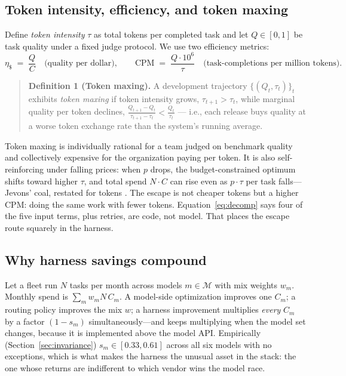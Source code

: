\documentclass[11pt]{article}
\newcommand{\NM}{six}                   %
\begin{document}
\subsection{Token intensity, efficiency, and token maxing}

Define \emph{token intensity} $\tau$ as total tokens per completed task and let $Q\in[0,1]$ be task quality under a fixed judge protocol. We use two efficiency metrics:
\begin{equation}
\eta_{\$} \;=\; \frac{Q}{C} \quad \text{(quality per dollar)}, \qquad
\mathrm{CPM} \;=\; \frac{Q \cdot 10^{6}}{\tau} \quad \text{(task-completions per million tokens)}.
\label{eq:eff}
\end{equation}

\begin{quote}
\textbf{Definition 1 (Token maxing).}\label{def:maxing}
A development trajectory $\{(Q_t,\tau_t)\}_t$ exhibits \emph{token maxing} if token intensity grows, $\tau_{t+1} > \tau_t$, while marginal quality per token declines, $\frac{Q_{t+1}-Q_t}{\tau_{t+1}-\tau_t} < \frac{Q_t}{\tau_t}$ --- i.e., each release buys quality at a worse token exchange rate than the system's running average.
\end{quote}

Token maxing is individually rational for a team judged on benchmark quality and collectively expensive for the organization paying per token. It is also self-reinforcing under falling prices: when $p$ drops, the budget-constrained optimum shifts toward higher $\tau$, and total spend $N\cdot C$ can rise even as $p\cdot\tau$ per task falls---Jevons' coal, restated for tokens \cite{jevons1865,epoch2025}. The escape is not cheaper tokens but a higher $\mathrm{CPM}$: doing the same work with fewer tokens. Equation~\eqref{eq:decomp} says four of the five input terms, plus retries, are code, not model. That places the escape route squarely in the harness.

\subsection{Why harness savings compound}

Let a fleet run $N$ tasks per month across models $m\in\mathcal{M}$ with mix weights $w_m$. Monthly spend is $\sum_m w_m N\, C_m$. A model-side optimization improves one $C_m$; a routing policy improves the mix $w$; a harness improvement multiplies \emph{every} $C_m$ by a factor $(1-s_m)$ simultaneously---and keeps multiplying when the model set changes, because it is implemented above the model API. Empirically (Section~\ref{sec:invariance}) $s_m \in [0.33, 0.61]$ across all \NM{} models with no exceptions, which is what makes the harness the unusual asset in the stack: the one whose returns are indifferent to which vendor wins the model race.
\end{document}
